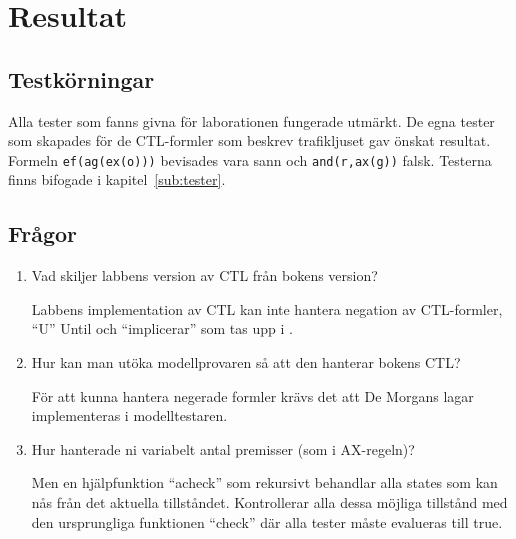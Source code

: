 \section{Resultat}

\subsection{Testkörningar}
\label{sub:test}

Alla tester som fanns givna för laborationen fungerade utmärkt. De egna tester som skapades för de CTL-formler som beskrev trafikljuset gav önskat resultat. Formeln \texttt{ef(ag(ex(o)))} bevisades vara sann och \texttt{and(r,ax(g))} falsk. Testerna finns bifogade i kapitel~\ref{sub:tester}.


\subsection{Frågor}
\label{sub:fragor}

\renewcommand{\labelenumi}{(\alph{enumi})}
\begin{enumerate}
\item Vad skiljer labbens version av CTL från bokens version?

Labbens implementation av CTL kan inte hantera negation av CTL-formler, “U” Until och
“implicerar” som tas upp i \cite{huth}.

\item Hur kan man utöka modellprovaren så att den hanterar bokens CTL?

För att kunna hantera negerade formler krävs det att De Morgans lagar implementeras i
modelltestaren. 

\item Hur hanterade ni variabelt antal premisser (som i AX-regeln)?

Men en hjälpfunktion “acheck” som rekursivt behandlar alla states som kan nås från det aktuella tillståndet. Kontrollerar alla dessa möjliga tillstånd med den ursprungliga funktionen “check” där alla tester måste evalueras till true.

\end{enumerate}